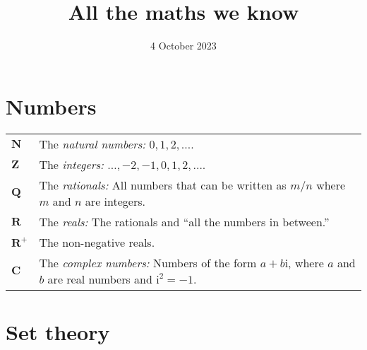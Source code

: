 \documentclass[10pt, a4paper, twocolumn]{article}
\title{All the maths we know}
\date{4 October 2023}
\author{}
\newcommand{\set}[1]{\mathbold{#1}}
\newcommand{\imag}{\mathrm{i}}
\begin{document}
\maketitle
\section*{Numbers}
\begin{tabularx}{\columnwidth}{@{}p{}>{\raggedright\arraybackslash}X@{}}
  \toprule
  $\set{N}$ & The \emph{natural numbers:} $0, 1, 2, \dotsc$. \\
  $\set{Z}$ & The \emph{integers:} $\dotsc, -2, -1, 0, 1, 2, \dotsc$. \\
  $\set{Q}$ & The \emph{rationals:} All numbers that can be written
  as $m/n$ where $m$ and $n$ are integers. \\
  $\set{R}$ & The \emph{reals:} The rationals and ``all the numbers in
  between.'' \\
  $\set{R}^+$ & The non-negative reals. \\
  $\set{C}$ & The \emph{complex numbers:} Numbers of the form $a + b\imag$, where $a$ and $b$ are real numbers and $\imag^2=-1$. 
\end{tabularx}

\section*{Set theory}
\end{document}
